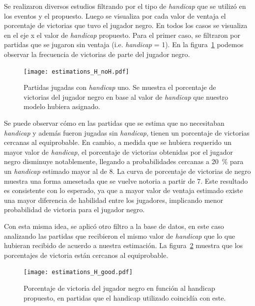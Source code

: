 \documentclass[11pt,twoside,spanish]{report} %
\begin{document}
Se realizaron diversos estudios filtrando por el tipo de \textit{handicap} que se utiliz\'o en los eventos y el propuesto.
Luego se visualiza por cada valor de ventaja el porcentaje de victorias que tuvo el jugador negro.
En todos los casos se visualiza en el eje x el valor de \textit{handicap} propuesto.
Para el primer caso, se filtraron por partidas que se jugaron sin ventaja (i.e. \textit{handicap} = 1). 
En la figura~\ref{fig:handicap_porcentaje_no_asignado} podemos observar la frecuencia de victorias de parte del jugador negro.


\begin{figure}[H]
    \centering
    \texttt{[image: estimations\_H\_noH.pdf]}
    \caption{Partidas jugadas con \textit{handicap} uno. Se muestra el porcentaje de victorias del jugador negro en base al valor de \textit{handicap} que nuestro modelo hubiera asignado.}
    \label{fig:handicap_porcentaje_no_asignado}
\end{figure}

Se puede observar c\'omo en las partidas que se estima que no necesitaban \textit{handicap} y adem\'as fueron jugadas sin \textit{handicap}, tienen un porcentaje de victorias cercanas al equiprobable.
En cambio, a medida que se hubiera requerido un mayor valor de \textit{handicap}, el porcentaje de victorias obtenidas por el jugador negro disminuye notablemente, llegando a probabilidades cercanas a \SI{20}{\percent} para un \textit{handicap} estimado mayor al de 8.
La curva de porcentaje de victorias de negro muestra una forma amesetada que se vuelve notoria a partir de 7.
Este resultado es consistente con lo esperado, ya que a mayor valor de ventaja estimado existe una mayor diferencia de habilidad entre los jugadores, implicando menor probabilidad de victoria para el jugador negro.

Con esta misma idea, se aplic\'o otro filtro a la base de datos, en este caso analizando las partidas que recibieron el mismo valor de \textit{handicap} que lo que hubieran recibido de acuerdo a nuestra estimaci\'on.
La figura~\ref{fig:handicap_porcentaje_bien} muestra que los porcentajes de victoria est\'an cercanos al equiprobable.

\begin{figure}[H]
    \centering
    \texttt{[image: estimations\_H\_good.pdf]}
    \caption{Porcentaje de victoria del jugador negro en funci\'on al handicap propuesto, en partidas que el handicap utilizado coincid\'ia con este.}
    \label{fig:handicap_porcentaje_bien}
\end{figure}
\end{document}
